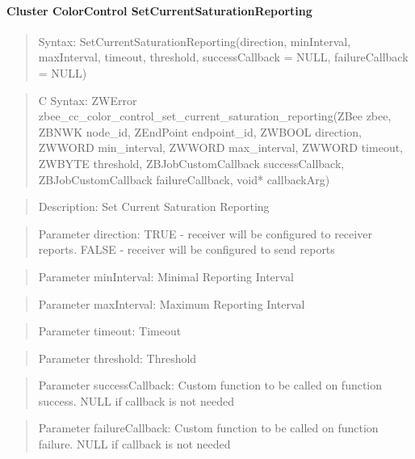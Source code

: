 \paragraph{Cluster ColorControl SetCurrentSaturationReporting}
\begin{quote}Syntax: SetCurrentSaturationReporting(direction, minInterval, maxInterval, timeout, threshold, successCallback = NULL, failureCallback = NULL)\end{quote}
\begin{quote}C Syntax: ZWError zbee\_cc\_color\_control\_set\_current\_saturation\_reporting(ZBee zbee, ZBNWK node\_id, ZEndPoint endpoint\_id, ZWBOOL direction, ZWWORD min\_interval, ZWWORD max\_interval, ZWWORD timeout, ZWBYTE threshold, ZBJobCustomCallback successCallback, ZBJobCustomCallback failureCallback, void* callbackArg)\end{quote}
\begin{quote}Description: Set Current Saturation Reporting\end{quote}
\begin{quote}Parameter direction: TRUE  - receiver will be configured to receiver reports. FALSE - receiver will be configured to send reports\end{quote}
\begin{quote}Parameter minInterval: Minimal Reporting Interval\end{quote}
\begin{quote}Parameter maxInterval: Maximum Reporting Interval\end{quote}
\begin{quote}Parameter timeout: Timeout\end{quote}
\begin{quote}Parameter threshold: Threshold\end{quote}
\begin{quote}Parameter successCallback: Custom function to be called on function success. NULL if callback is not needed\end{quote}
\begin{quote}Parameter failureCallback: Custom function to be called on function failure. NULL if callback is not needed\end{quote}


